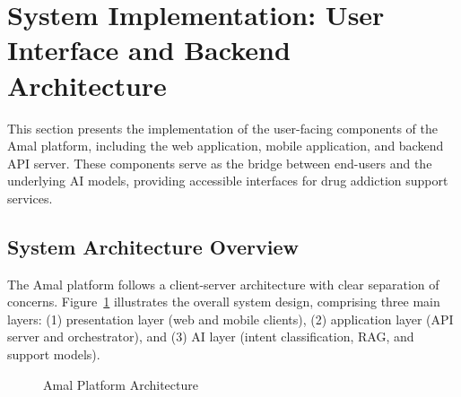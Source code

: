\section{System Implementation: User Interface and Backend Architecture}

This section presents the implementation of the user-facing components of the Amal platform, including the web application, mobile application, and backend API server. These components serve as the bridge between end-users and the underlying AI models, providing accessible interfaces for drug addiction support services.

\subsection{System Architecture Overview}

The Amal platform follows a client-server architecture with clear separation of concerns. Figure~\ref{fig:architecture} illustrates the overall system design, comprising three main layers: (1) presentation layer (web and mobile clients), (2) application layer (API server and orchestrator), and (3) AI layer (intent classification, RAG, and support models).

\begin{figure}[h]
\centering
{}
\caption{Amal Platform Architecture}
\label{fig:architecture}
\end{figure}

